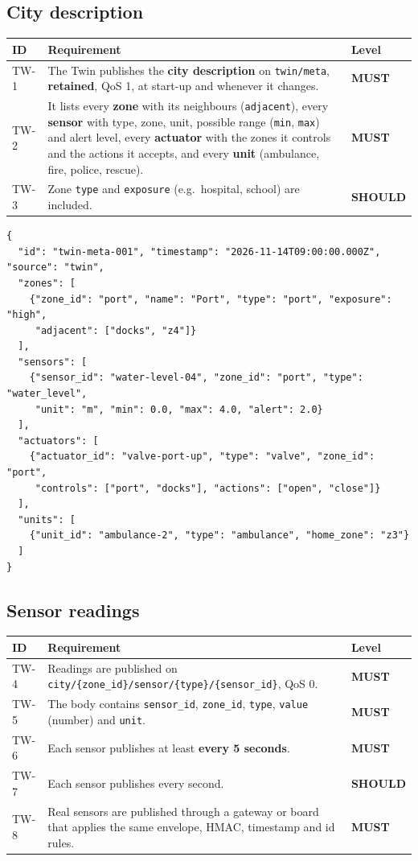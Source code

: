 \documentclass[11pt,a4paper]{article}
\newcommand{\code}[1]{\texttt{#1}}
\newcommand{\MUST}{\textbf{\textcolor{must}{MUST}}}
\newcommand{\SHOULD}{\textbf{\textcolor{should}{SHOULD}}}
\begin{document}
\subsection{City description}

\begin{longtable}{@{}l p{10.9cm} l@{}}
\toprule
\textbf{ID} & \textbf{Requirement} & \textbf{Level} \\
\midrule
\endhead
TW-1 & The Twin publishes the \textbf{city description} on \code{twin/meta}, \textbf{retained}, QoS 1, at start-up and whenever it changes. & \MUST \\
TW-2 & It lists every \textbf{zone} with its neighbours (\code{adjacent}), every \textbf{sensor} with type, zone, unit, possible range (\code{min}, \code{max}) and alert level, every \textbf{actuator} with the zones it controls and the actions it accepts, and every \textbf{unit} (ambulance, fire, police, rescue). & \MUST \\
TW-3 & Zone \code{type} and \code{exposure} (e.g.\ hospital, school) are included. & \SHOULD \\
\bottomrule
\end{longtable}

\begin{lstlisting}[caption={Body of the city description (shortened)}]
{
  "id": "twin-meta-001", "timestamp": "2026-11-14T09:00:00.000Z", "source": "twin",
  "zones": [
    {"zone_id": "port", "name": "Port", "type": "port", "exposure": "high",
     "adjacent": ["docks", "z4"]}
  ],
  "sensors": [
    {"sensor_id": "water-level-04", "zone_id": "port", "type": "water_level",
     "unit": "m", "min": 0.0, "max": 4.0, "alert": 2.0}
  ],
  "actuators": [
    {"actuator_id": "valve-port-up", "type": "valve", "zone_id": "port",
     "controls": ["port", "docks"], "actions": ["open", "close"]}
  ],
  "units": [
    {"unit_id": "ambulance-2", "type": "ambulance", "home_zone": "z3"}
  ]
}
\end{lstlisting}

\subsection{Sensor readings}

\begin{longtable}{@{}l p{10.9cm} l@{}}
\toprule
\textbf{ID} & \textbf{Requirement} & \textbf{Level} \\
\midrule
\endhead
TW-4 & Readings are published on \code{city/\allowbreak \{zone\_id\}/\allowbreak sensor/\allowbreak \{type\}/\allowbreak \{sensor\_id\}}, QoS 0. & \MUST \\
TW-5 & The body contains \code{sensor\_id}, \code{zone\_id}, \code{type}, \code{value} (number) and \code{unit}. & \MUST \\
TW-6 & Each sensor publishes at least \textbf{every 5 seconds}. & \MUST \\
TW-7 & Each sensor publishes every second. & \SHOULD \\
TW-8 & Real sensors are published through a gateway or board that applies the same envelope, HMAC, timestamp and id rules. & \MUST \\
\bottomrule
\end{longtable}
\end{document}
